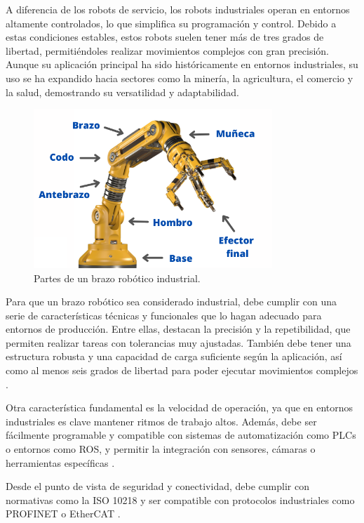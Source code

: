 A diferencia de los robots de servicio, los robots industriales operan en entornos altamente controlados, lo que simplifica su programación y control. Debido a estas condiciones estables, estos robots suelen tener más de tres grados de libertad, permitiéndoles realizar movimientos complejos con gran precisión. Aunque su aplicación principal ha sido históricamente en entornos industriales, su uso se ha expandido hacia sectores como la minería, la agricultura, el comercio y la salud, demostrando su versatilidad y adaptabilidad. \\

\begin{figure} [h!]
  \begin{center}
    \includegraphics[width=9cm]{figs/brazo_industrial}
  \end{center}
  \caption{\centering Partes de un brazo robótico industrial.}
  \label{fig:brazo_industrials}
\end{figure}

Para que un brazo robótico sea considerado industrial, debe cumplir con una serie de características técnicas y funcionales que lo hagan adecuado para entornos de producción. Entre ellas, destacan la precisión y la repetibilidad, que permiten realizar tareas con tolerancias muy ajustadas. También debe tener una estructura robusta y una capacidad de carga suficiente según la aplicación, así como al menos seis grados de libertad para poder ejecutar movimientos complejos \cite{brazo_industrial}.

Otra característica fundamental es la velocidad de operación, ya que en entornos industriales es clave mantener ritmos de trabajo altos. Además, debe ser fácilmente programable y compatible con sistemas de automatización como PLCs o entornos como ROS, y permitir la integración con sensores, cámaras o herramientas específicas  \cite{brazo_industrial}.

Desde el punto de vista de seguridad y conectividad, debe cumplir con normativas como la ISO 10218 y ser compatible con protocolos industriales como PROFINET o EtherCAT \cite{brazo_industrial}. \\

